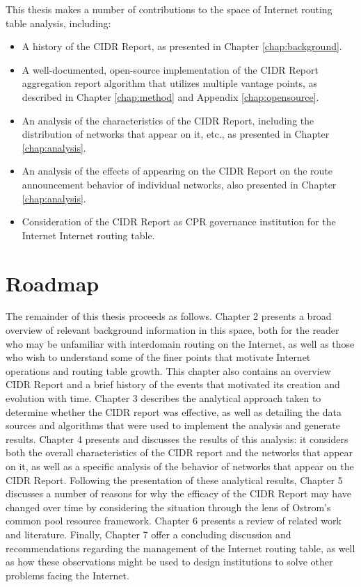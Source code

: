 This thesis makes a number of contributions to the space of Internet routing table analysis, including:
\begin{itemize}
\item{A history of the CIDR Report, as presented in Chapter \ref{chap:background}.}
\item{A well-documented, open-source implementation of the CIDR Report aggregation report algorithm that utilizes multiple vantage points, as described in Chapter \ref{chap:method} and Appendix \ref{chap:opensource}.}
\item{An analysis of the characteristics of the CIDR Report, including the distribution of networks that appear on it, etc., as presented in Chapter \ref{chap:analysis}.}
\item{An analysis of the effects of appearing on the CIDR Report on the route announcement behavior of individual networks, also presented in Chapter \ref{chap:analysis}.}
\item{Consideration of the CIDR Report as CPR governance institution for the Internet Internet routing table.}
\end{itemize}

\section{Roadmap}

The remainder of this thesis proceeds as follows. Chapter 2 presents a broad overview of relevant background information in this space, both for the reader who may be unfamiliar with interdomain routing on the Internet, as well as those who wish to understand some of the finer points that motivate Internet operations and routing table growth. This chapter also contains an overview CIDR Report and a brief history of the events that motivated its creation and evolution with time. Chapter 3 describes the analytical approach taken to determine whether the CIDR report was effective, as well as detailing the data sources and algorithms that were used to implement the analysis and generate results. Chapter 4 presents and discusses the results of this analysis: it considers both the overall characteristics of the CIDR report and the networks that appear on it, as well as a specific analysis of the behavior of networks that appear on the CIDR Report. Following the presentation of these analytical results, Chapter 5 discusses a number of reasons for why the efficacy of the CIDR Report may have changed over time by considering the situation through the lens of Ostrom's common pool resource framework. Chapter 6 presents a review of related work and literature. Finally, Chapter 7 offer a concluding discussion and recommendations regarding the management of the Internet routing table, as well as how these observations might be used to design institutions to solve other problems facing the Internet.